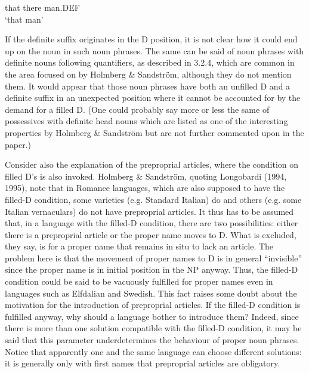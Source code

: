 that  there  man.DEF\\ %


‘that man’
\z

If the definite suffix originates in the D position, it is not clear how it could end up on the noun in such noun phrases. The same can be said of noun phrases with definite nouns following quantifiers, as described in 3.2.4, which are common in the area focused on by Holmberg \& Sandström, although they do not mention them. It would appear that those noun phrases have both an unfilled D and a definite suffix in an unexpected position where it cannot be accounted for by the demand for a filled D. (One could probably say more or less the same of possessives with definite head nouns which are listed as one of the interesting properties by Holmberg \& Sandström but are not further commented upon in the paper.)

Consider also the explanation of the preproprial articles, where the condition on filled D’s is also invoked. Holmberg \& Sandström, quoting Longobardi (1994, 1995), note that in Romance languages, which are also supposed to have the filled-D condition, some varieties (e.g. Standard Italian) do and others (e.g. some Italian vernaculars) do not have preproprial articles. It thus has to be assumed that, in a language with the filled-D condition, there are two possibilities: either there is a preproprial article or the proper name moves to D. What is excluded, they say, is for a proper name that remains in situ to lack an article. The problem here is that the movement of proper names to D is in general “invisible” since the proper name is in initial position in the NP anyway. Thus, the filled-D condition could be said to be vacuously fulfilled for proper names even in languages such as Elfdalian and Swedish. This fact raises some doubt about the motivation for the introduction of preproprial articles. If the filled-D condition is fulfilled anyway, why should a language bother to introduce them? Indeed, since there is more than one solution compatible with the filled-D condition, it may be said that this parameter underdetermines the behaviour of proper noun phrases. Notice that apparently one and the same language can choose different solutions: it is generally only with first names that preproprial articles are obligatory. 

